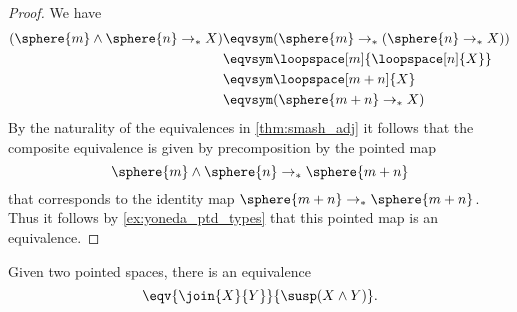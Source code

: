 \begin{proof}
We have
\begin{align*}
({\sphere{m}}\wedge{\sphere{n}}\to_\ast X) & \eqvsym (\sphere{m}\to_\ast (\sphere{n}\to_\ast X)) \\
& \eqvsym \loopspace[m]{\loopspace[n]{X}} \\
& \eqvsym \loopspace[m+n]{X} \\
& \eqvsym (\sphere{m+n}\to_\ast X)
\end{align*}
By the naturality of the equivalences in \autoref{thm:smash_adj} it follows that the composite equivalence is given by precomposition by the pointed map 
\begin{equation*}
\sphere{m}\wedge\sphere{n}\to_\ast \sphere{m+n}
\end{equation*}
that corresponds to the identity map $\sphere{m+n}\to_\ast \sphere{m+n}$. Thus it follows by \autoref{ex:yoneda_ptd_types} that this pointed map is an equivalence.
\end{proof}

\begin{thm}
Given two pointed spaces, there is an equivalence
\begin{equation*}
\eqv{\join{X}{Y}}{\susp(X\wedge Y)}.
\end{equation*}
\end{thm}

